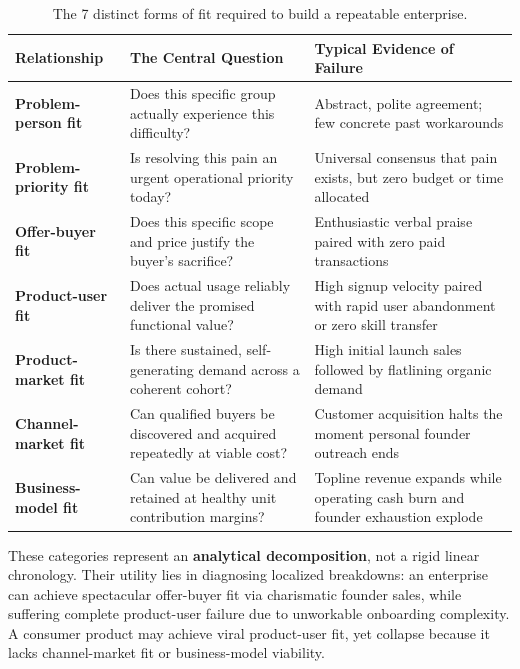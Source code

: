 \begin{table}[t]
\centering
\small
\begin{tabularx}{\textwidth}{>{\raggedright\arraybackslash}p{4cm} >{\raggedright\arraybackslash}X >{\raggedright\arraybackslash}X}
\toprule
\textbf{Relationship} & \textbf{The Central Question} & \textbf{Typical Evidence of Failure} \\
\midrule
\textbf{Problem-person fit} & Does this specific group actually experience this difficulty? & Abstract, polite agreement; few concrete past workarounds \\
\textbf{Problem-priority fit} & Is resolving this pain an urgent operational priority today? & Universal consensus that pain exists, but zero budget or time allocated \\
\textbf{Offer-buyer fit} & Does this specific scope and price justify the buyer's sacrifice? & Enthusiastic verbal praise paired with zero paid transactions \\
\textbf{Product-user fit} & Does actual usage reliably deliver the promised functional value? & High signup velocity paired with rapid user abandonment or zero skill transfer \\
\textbf{Product-market fit} & Is there sustained, self-generating demand across a coherent cohort? & High initial launch sales followed by flatlining organic demand \\
\textbf{Channel-market fit} & Can qualified buyers be discovered and acquired repeatedly at viable cost? & Customer acquisition halts the moment personal founder outreach ends \\
\textbf{Business-model fit} & Can value be delivered and retained at healthy unit contribution margins? & Topline revenue expands while operating cash burn and founder exhaustion explode \\
\bottomrule
\end{tabularx}
\caption{The 7 distinct forms of fit required to build a repeatable enterprise.}
\label{tab:ch9-forms-of-fit}
\end{table}

These categories represent an \textbf{analytical decomposition}, not a rigid linear chronology. Their utility lies in diagnosing localized breakdowns: an enterprise can achieve spectacular offer-buyer fit via charismatic founder sales, while suffering complete product-user failure due to unworkable onboarding complexity. A consumer product may achieve viral product-user fit, yet collapse because it lacks channel-market fit or business-model viability.
